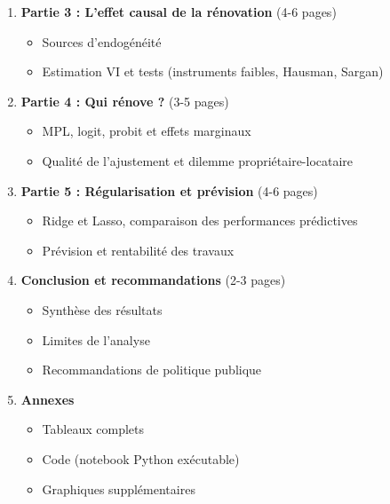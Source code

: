 \documentclass[11pt,a4paper]{article}
\begin{document}
\begin{enumerate}
\begin{itemize}
    \end{itemize}
  \item \textbf{Partie 3 : L'effet causal de la rénovation} (4-6 pages)
    \begin{itemize}
      \item Sources d'endogénéité
      \item Estimation VI et tests (instruments faibles, Hausman, Sargan)
    \end{itemize}
  \item \textbf{Partie 4 : Qui rénove ?} (3-5 pages)
    \begin{itemize}
      \item MPL, logit, probit et effets marginaux
      \item Qualité de l'ajustement et dilemme propriétaire-locataire
    \end{itemize}
  \item \textbf{Partie 5 : Régularisation et prévision} (4-6 pages)
    \begin{itemize}
      \item Ridge et Lasso, comparaison des performances prédictives
      \item Prévision et rentabilité des travaux
    \end{itemize}
  \item \textbf{Conclusion et recommandations} (2-3 pages)
    \begin{itemize}
      \item Synthèse des résultats
      \item Limites de l'analyse
      \item Recommandations de politique publique
    \end{itemize}
  \item \textbf{Annexes}
    \begin{itemize}
      \item Tableaux complets
      \item Code (notebook Python exécutable)
      \item Graphiques supplémentaires
    \end{itemize}
\end{enumerate}
\end{document}
